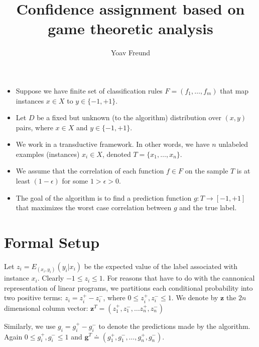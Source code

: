 \documentclass{article}[12pt]
\title{Confidence assignment based on game theoretic analysis}
\author{Yoav Freund}
\begin{document}
\maketitle

\newcommand{\corr}{\mbox{corr}}
\newcommand{\Exy}[1]{E_{(x_i,y_i)}\left( #1 \right)} 
\newcommand{\ones}[1]{\mathbbm{1}^{#1}}
\newcommand{\vA}{\mathbf{A}}
\newcommand{\vF}{\mathbf{F}}
\newcommand{\vI}{\mathbf{I}}
\newcommand{\vb}{\mathbf{b}}
\newcommand{\vc}{\mathbf{c}}
\newcommand{\vg}{\mathbf{g}}
\newcommand{\vr}{\mathbf{r}}
\newcommand{\vs}{\mathbf{s}}
\newcommand{\vv}{\mathbf{v}}
\newcommand{\vz}{\mathbf{z}}
\newcommand{\vzero}{\mathbf{0}}
\newcommand{\vone}{\mathbf{1}}

\begin{itemize}
\item Suppose we have finite set of classification rules $F=(f_1,\ldots,f_m)$
that map instances $x \in X$ to $y \in \{-1,+1\}$. 
\item
Let $D$ be a fixed but unknown (to the algorithm) distribution over
$(x,y)$ pairs, where $x \in X$ and $y \in \{-1,+1\}$.
\item
We work in a transductive framework. In other words, we have $n$
unlabeled examples (instances) $x_i \in X$, denoted
$T=\{x_1,\ldots,x_n\}$.
\item
We assume that the correlation of each function $f \in F$ on the sample
$T$ is at least $(1-\epsilon)$ for some $1>\epsilon>0$.
\item
The goal of the algorithm is to find a prediction function $g:T \to
[-1,+1]$ that maximizes the worst case correlation between $g$ and the
true label.
\end{itemize}

\section{Formal Setup}
Let $z_i = \Exy{y_i | x_i}$ be the expected value of the label
associated with instance $x_i$. Clearly $-1 \leq z_i \leq 1$. For
reasons that have to do with the cannonical representation of linear
programs, we partitions each conditional probability into two positive
terms: $z_i=z_i^+ - z_i^-$, where $0 \leq z_i^+ , z_i^- \leq 1$. We
denote by $\vz$ the $2n$ dimensional column vector:
$\vz^T=(z_1^+,z_1^-,\ldots z_n^+,z_n^-)$

Similarly, we use $g_i =g_i^+ - g_i^-$ to denote the predictions made
by the algorithm. Again $0 \leq g_i^+,g_i^- \leq 1$ and 
$\vg^T \doteq (g_1^+,g_1^-,\ldots, g_n^+,g_n^-)$.
\end{document}
